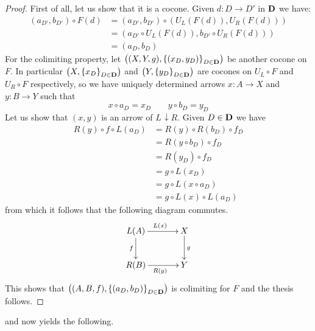 \documentclass[runningheads,envcountsect]{lipics-v2021}
\def\D{\textbf {\textup{D}}}
\newcommand{\comma}[2]{#1\hspace{1pt} {\downarrow}#2}
\begin{document}
\begin{proof}
	First of all, let us show that it is a cocone. Given $d\colon D\to D'$ in $\D$ we have:
	\begin{align*}
		\left(a_{D'}, b_{D'}\right)\circ F(d)&=	\left(a_{D'}, b_{D'}\right)\circ \left(U_L(F(d)), U_R(F(d))\right)\\&=\left( a_{D'}\circ U_L(F(d)),  b_{D'}\circ U_R(F(d)) \right)\\&=\left(a_D, b_D\right)
	\end{align*}
	For the colimiting property, let $\left((X, Y, g), \left\{\left(x_D, y_D\right)\right\}_{D\in \D}\right)$ be another cocone on $F$. In particular $\left(X, \left\{x_D\right\}_{D\in \D}\right)$ and $\left(Y, \left\{y_D\right\}_{D\in \D}\right)$ are cocones on $U_L\circ F$ and $U_R\circ F$ respectively, so we have uniquely determined arrows $x\colon A\rightarrow X$ and $y\colon B\rightarrow Y$ such that 
	\[x\circ a_D= x_D \qquad y\circ b_D= y_D\]
	Let us show that $(x,y)$ is an arrow of $\comma{L}{R}$. Given $D\in \D$ we have
	\begin{align*}
		R(y)\circ f\circ L(a_D)&=R(y)\circ R\left(b_D\right)\circ f_D\\&=R\left(y\circ b_D\right)\circ f_D\\&=R\left(y_D\right)\circ f_D\\&= g\circ L\left(x_D\right)\\&=g\circ L\left(x\circ a_D\right)\\&=g\circ L(x)\circ L\left(a_D\right)
	\end{align*}
	from which it follows  that the following diagram commutes.
	\[\xymatrix@C=35pt{L(A)\ar[d]_{f} \ar[r]^{L(x)} & X \ar[d]^{g}\\ R(B) \ar[r]_{R(y)}& Y}\]
	This shows that $\left((A, B, f), \left\{(a_D, b_D)\right\}_{D\in \D}\right)$ is colimiting for $F$ and the thesis follows.    
\end{proof} 


 and  now yields the following.
\end{document}
